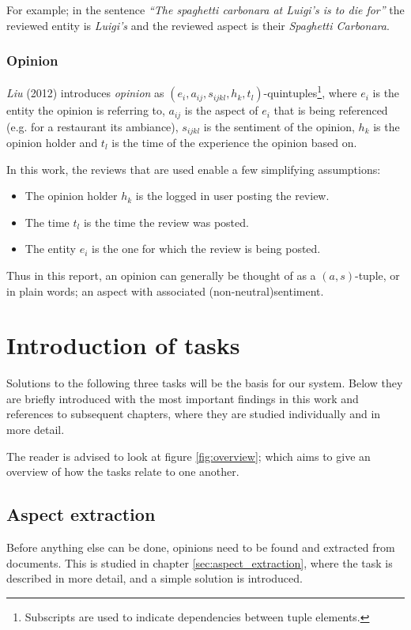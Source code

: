 \documentclass[a4paper,11pt]{kth-mag}
\begin{document}
For example; in the sentence \emph{``The spaghetti carbonara at Luigi's is to die for''} the reviewed entity is \emph{Luigi's} and the reviewed aspect is their \emph{Spaghetti Carbonara}.


\subsubsection{Opinion}
\emph{Liu} (2012) introduces \emph{opinion} as $(e_i,a_{ij},s_{ijkl},h_k,t_l)$-quintuples\footnote{Subscripts are
  used to indicate dependencies between tuple elements.},
where $e_i$ is the entity the opinion is referring to,
$a_{ij}$ is the aspect of $e_i$ that is being referenced (e.g. for a restaurant its ambiance),
$s_{ijkl}$ is the sentiment of the opinion,
$h_k$ is the opinion holder and
$t_l$ is the time of the experience the opinion based on\cite[Chapter~2.1]{liu2012sentiment}.

In this work, the reviews that are used enable a few simplifying assumptions:
\begin{itemize}
\item The opinion holder $h_k$ is the logged in user posting the review.
\item The time $t_l$ is the time the review was posted.
\item The entity $e_i$ is the one for which the review is being posted.
\end{itemize}

Thus in this report, an opinion can generally be thought of as a $(a,s)$-tuple, or in plain words; an aspect with associated (non-neutral)sentiment.


\section{Introduction of tasks}
Solutions to the following three tasks will be the basis for our system.
Below they are briefly introduced with the most important findings in this work and references
to subsequent chapters, where they are studied individually and in more detail.

The reader is advised to look at figure \ref{fig:overview}; which aims to
give an overview of how the tasks relate to one another.

\subsection{Aspect extraction}
Before anything else can be done, opinions need to be found and extracted from documents.
This is studied in chapter \ref{sec:aspect_extraction}, where the task is described in more detail,
and a simple solution is introduced.
\end{document}
